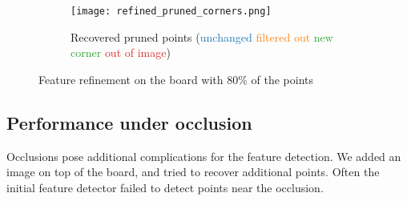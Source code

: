 \begin{figure}[h]
	\centering
	\begin{subfigure}[h]{0.45\linewidth}
	\end{subfigure}
	\hfill
	\begin{subfigure}[h]{0.45\linewidth}
	\end{subfigure}
	\begin{subfigure}[h]{\linewidth}
		\centering
		\texttt{[image: refined\_pruned\_corners.png]}
		\caption{Recovered pruned points
			(\textcolor[HTML]{1f77b4}{unchanged}
			\textcolor[HTML]{ff7f0e}{filtered out}
			\textcolor[HTML]{2ca02c}{new corner}
			\textcolor[HTML]{d62728}{out of image})}
	\end{subfigure}
	\hfill
	\caption{Feature refinement on the board with 80\% of the points}
\end{figure}

\newpage
\subsection{Performance under occlusion}\label{sub:performance_under_occlusion}

Occlusions pose additional complications for the feature detection. We added an
image on top of the board, and tried to recover additional points. Often the
initial feature detector failed to detect points near the occlusion.

